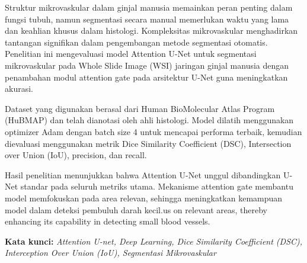 \begin{abstractind}
\justifying

\noindent Struktur mikrovaskular dalam ginjal manusia memainkan peran penting dalam fungsi tubuh, namun segmentasi secara manual memerlukan waktu yang lama dan keahlian khusus dalam histologi. Kompleksitas mikrovaskular menghadirkan tantangan signifikan dalam pengembangan metode segmentasi otomatis. Penelitian ini mengevaluasi model Attention U-Net untuk segmentasi mikrovaskular pada Whole Slide Image (WSI) jaringan ginjal manusia dengan penambahan modul attention gate pada arsitektur U-Net guna meningkatkan akurasi.

\noindent Dataset yang digunakan berasal dari Human BioMolecular Atlas Program (HuBMAP) dan telah dianotasi oleh ahli histologi. Model dilatih menggunakan optimizer Adam dengan batch size 4 untuk mencapai performa terbaik, kemudian dievaluasi menggunakan metrik Dice Similarity Coefficient (DSC), Intersection over Union (IoU), precision, dan recall.

\noindent Hasil penelitian menunjukkan bahwa Attention U-Net unggul dibandingkan U-Net standar pada seluruh metriks utama. Mekanisme attention gate membantu model memfokuskan pada area relevan, sehingga meningkatkan kemampuan model dalam deteksi pembuluh darah kecil.us on relevant areas, thereby enhancing its capability in detecting small blood vessels.

\bigskip
\noindent
\textbf{Kata kunci:} \textit{Attention U-net, Deep Learning, Dice Similarity Coefficient (DSC), Interception Over Union (IoU), Segmentasi Mikrovaskular}  %
\end{abstractind}
